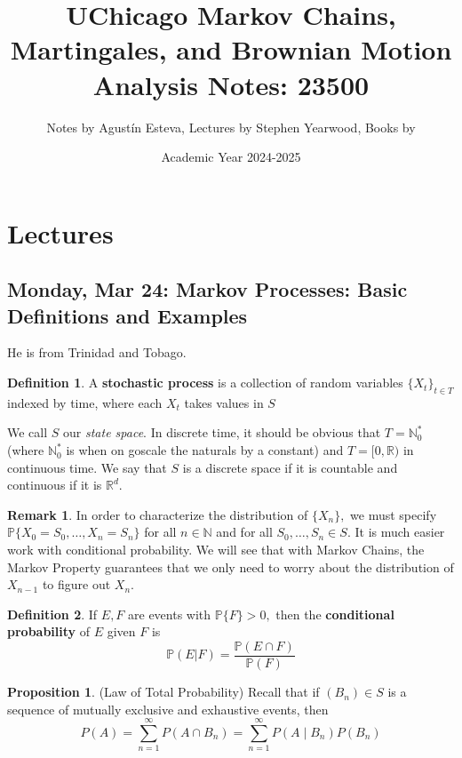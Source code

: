 \documentclass[10pt, oneside]{article}
\title{UChicago Markov Chains, Martingales, and Brownian Motion Analysis Notes: 23500}
\author{Notes by Agustín Esteva, Lectures by Stephen Yearwood, Books by }
\date{Academic Year 2024-2025}
\newcommand{\bbR}{\mathbb{R}}
\newcommand{\bbN}{\mathbb{N}}
\theoremstyle{definition}
\newtheorem{defn}{Definition}
\newtheorem{prop}{Proposition}
\newtheorem{rem}{Remark}
\begin{document}
\maketitle
\tableofcontents

\vspace{.25in}


\newpage
\section{Lectures}

\subsection{Monday, Mar 24: Markov Processes: Basic Definitions and Examples}
He is from Trinidad and Tobago. 
\begin{defn}
    A \textbf{stochastic process}  is a collection of random variables $\{X_t\}_{t \in T}$ indexed by time, where each $X_t$ takes values in $S$
\end{defn}
We call $S$ our \textit{state space}. In discrete time, it should be obvious that $T = \bbN_0^*$ (where $\bbN_0^*$ is when on goscale the naturals by a constant) and $T = [0, \bbR)$ in continuous time. We say that $S$ is a discrete space if it is countable and continuous if it is $\bbR^d.$
\begin{rem}
    In order to characterize the distribution of $\{X_n\},$ we must specify $\mathbb{P}\{X_0 = S_0, \dots, X_n = S_n\}$ for all $n \in \bbN$ and for all $S_0, \dots, S_n \in S.$ It is much easier work with conditional probability. We will see that with Markov Chains, the Markov Property guarantees that we only need to worry about the distribution of $X_{n-1}$ to figure out $X_n.$
\end{rem}
\begin{defn}
    If $E,F$ are events with $\mathbb{P}\{F\} >0,$ then the \textbf{conditional probability} of $E$ given $F$ is 
    \[\mathbb{P}(E | F) = \frac{\mathbb{P}(E \cap F)}{\mathbb{P}(F)}\]
\end{defn}
\begin{prop}
    (Law of Total Probability) Recall that if $(B_n) \in S$ is a sequence of mutually exclusive and exhaustive events, then 
    \[P(A) = \sum_{n=1}^\infty P(A \cap B_n) = \sum_{n=1}^\infty P(A \mid B_n)P(B_n)\]
\end{prop}
\end{document}
